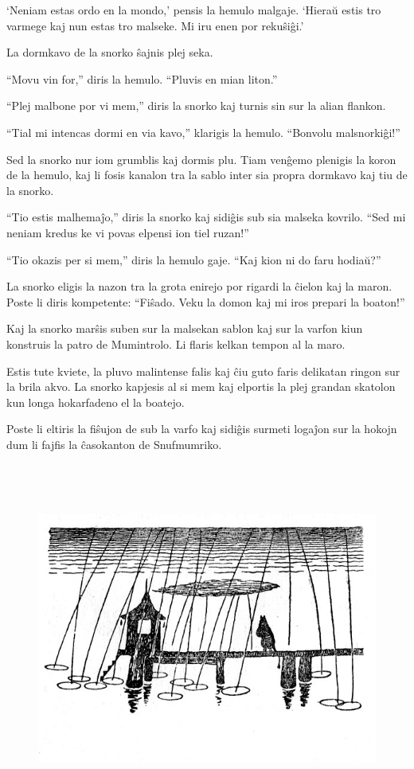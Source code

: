 `Neniam estas ordo en la mondo,' pensis la hemulo malgaje. `Hieraŭ estis tro varmege kaj nun estas tro malseke. Mi iru enen por rekuŝiĝi.'

La dormkavo de la snorko ŝajnis plej seka.

``Movu vin for,'' diris la hemulo. ``Pluvis en mian liton.''

``Plej malbone por vi mem,'' diris la snorko kaj turnis sin sur la alian flankon.

``Tial mi intencas dormi en via kavo,'' klarigis la hemulo. ``Bonvolu malsnorkiĝi!''

Sed la snorko nur iom grumblis kaj dormis plu. Tiam venĝemo plenigis la koron de la hemulo, kaj li fosis kanalon tra la sablo inter sia propra dormkavo kaj tiu de la snorko.

``Tio estis malhemaĵo,'' diris la snorko kaj sidiĝis sub sia malseka kovrilo. ``Sed mi neniam kredus ke vi povas elpensi ion tiel ruzan!''

``Tio okazis per si mem,'' diris la hemulo gaje. ``Kaj kion ni do faru hodiaŭ?''

La snorko eligis la nazon tra la grota enirejo por rigardi la ĉielon kaj la maron. Poste li diris kompetente: ``Fiŝado. Veku la domon kaj mi iros prepari la boaton!''

Kaj la snorko marŝis suben sur la malsekan sablon kaj sur la varfon kiun konstruis la patro de Mumintrolo. Li flaris kelkan tempon al la maro.

Estis tute kviete, la pluvo malintense falis kaj ĉiu guto faris delikatan ringon sur la brila akvo. La snorko kapjesis al si mem kaj elportis la plej grandan skatolon kun longa hokarfadeno el la boatejo.

Poste li eltiris la fiŝujon de sub la varfo kaj sidiĝis surmeti logaĵon sur la hokojn dum li fajfis la ĉasokanton de Snufmumriko.

\begin{figure}[htbp]
\centering
\includegraphics[width=448pt,height=330pt]{_24.jpg}
\caption{}
\label{_24}
\end{figure}

